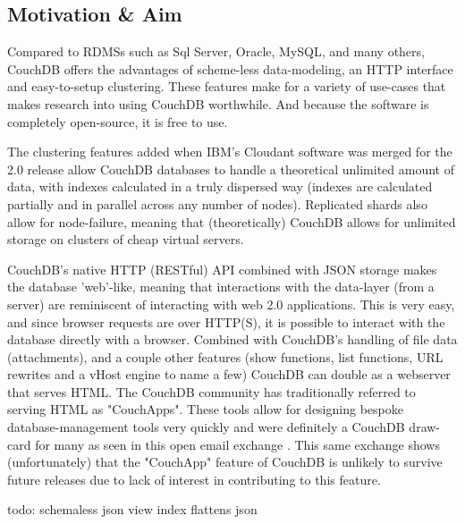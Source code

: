 % 

\subsection{Motivation \& Aim}
Compared to RDMSs such as Sql Server, Oracle, MySQL, and many others, CouchDB offers the advantages of scheme-less data-modeling, an HTTP interface and easy-to-setup clustering. These features make for a variety of use-cases that makes research into using CouchDB worthwhile. And because the software is completely open-source, it is free to use.

The clustering features added when IBM's Cloudant software was merged for the 2.0 release allow CouchDB databases to handle a theoretical unlimited amount of data, with indexes calculated in a truly dispersed way (indexes are calculated partially and in parallel across any number of nodes). Replicated shards also allow for node-failure, meaning that (theoretically) CouchDB allows for unlimited storage on clusters of cheap virtual servers.

CouchDB's native HTTP (RESTful) API combined with JSON storage makes the database 'web'-like, meaning that interactions with the data-layer (from a server) are reminiscent of interacting with web 2.0 applications. This is very easy, and since browser requests are over HTTP(S), it is possible to interact with the database directly with a browser. Combined with CouchDB's handling of file data (attachments), and a couple other features (show functions, list functions, URL rewrites and a vHost engine to name a few) CouchDB can double as a webserver that serves HTML. The CouchDB community has traditionally referred to serving HTML as "CouchApps". These tools allow for designing bespoke database-management tools very quickly and were definitely a CouchDB draw-card for many as seen in this open email exchange \cite{googleCon2017}. This same exchange shows (unfortunately) that the "CouchApp" feature of CouchDB is unlikely to survive future releases due to lack of interest in contributing to this feature.

todo: schemaless json
view index flattens json